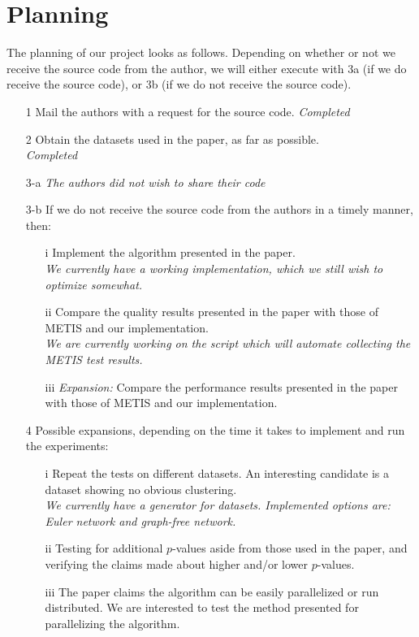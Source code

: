 \documentclass[a4paper,11pt]{article}
\begin{document}
\section{Planning}
The planning of our project looks as follows. Depending on whether or not we receive the source code from the author, we will either execute with 3a (if we do receive the source code), or 3b (if we do not receive the source code).
\begin{enumerate}
\item[1] Mail the authors with a request for the source code. \textit{Completed}\item[2] Obtain the datasets used in the paper, as far as possible. \\
\textit{Completed}
\item[3-a] \textit{The authors did not wish to share their code}
\item[3-b] If we do not receive the source code from the authors in a timely manner, then:
\begin{enumerate}
\item[i] Implement the algorithm presented in the paper. \\
\textit{We currently have a working implementation, which we still wish to optimize somewhat.}
\item[ii] Compare the quality results presented in the paper with those of METIS and our implementation.\\
\textit{We are currently working on the script which will automate collecting the METIS test results.} %
\item[iii] \textit{Expansion:} Compare the performance results presented in the paper with those of METIS and our implementation.
\end{enumerate}
\item[4] Possible expansions, depending on the time it takes to implement and run the experiments:
\begin{enumerate}
\item[i] Repeat the tests on different datasets. An interesting candidate is a dataset showing no obvious clustering. \\
\textit{We currently have a generator for datasets. Implemented options are: Euler network and graph-free network.} %
\item[ii] Testing for additional $p$-values aside from those used in the paper, and verifying the claims made about higher and/or lower $p$-values.
\item[iii] The paper claims the algorithm can be easily parallelized or run distributed. We are interested to test the method presented for parallelizing the algorithm.
\end{enumerate}
\end{enumerate}
\end{document}
